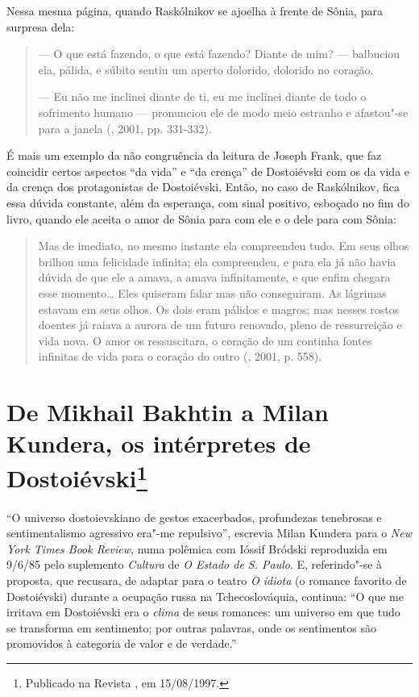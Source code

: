 Nessa mesma página, quando Raskólnikov se ajoelha à frente de Sônia,
para surpresa dela:

\begin{quotation}
--- O que está fazendo, o que está fazendo? Diante de mim? --- balbuciou
ela, pálida, e súbito sentiu um aperto dolorido, dolorido no coração.

--- Eu não me inclinei diante de ti, eu me inclinei diante de todo o
sofrimento humano --- pronunciou ele de modo meio estranho e afastou"-se
para a janela (, 2001, pp. 331-332).
\end{quotation}

É mais um exemplo da não congruência da leitura de Joseph Frank, que faz
coincidir certos aspectos ``da vida'' e ``da crença'' de Dostoiévski com
os da vida e da crença dos protagonistas de Dostoiévski. Então, no caso
de Raskólnikov, fica essa dúvida constante, além da esperança, com sinal
positivo, esboçado no fim do livro, quando ele aceita o amor de Sônia
para com ele e o dele para com Sônia:

\begin{quotation}
Mas de imediato, no mesmo instante ela compreendeu tudo. Em seus olhos
brilhou uma felicidade infinita; ela compreendeu, e para ela já não
havia dúvida de que ele a amava, a amava infinitamente, e que enfim
chegara esse momento\ldots{} Eles quiseram falar mas não conseguiram. As
lágrimas estavam em seus olhos. Os dois eram pálidos e magros; mas
nesses rostos doentes já raiava a aurora de um futuro renovado, pleno de
ressurreição e vida nova. O amor os ressuscitara, o coração de um
continha fontes infinitas de vida para o coração do outro (, 2001, p. 558).
\end{quotation}

\chapter{De Mikhail Bakhtin a Milan Kundera, os intérpretes de
Dostoiévski\footnote{Publicado na Revista {}, em 15/08/1997.}}

``O universo dostoievskiano de gestos exacerbados, profundezas
tenebrosas e sentimen­talismo agressivo era"-me repulsivo'', escrevia
Milan Kundera para o \emph{New York Times Book Review}, numa polêmica
com Ióssif Bródski reproduzida em 9/6/85 pelo suplemento \emph{Cultura}
de \emph{O Estado de S. Paulo}. E, referindo"-se à proposta, que
recusara, de adaptar para o teatro \emph{O idiota} (o romance favorito
de Dostoiévski) durante a ocupação russa na Tchecoslováquia, continua:
``O que me irritava em Dostoiévski era o \emph{clima} de seus romances:
um universo em que tudo se transforma em sentimento; por outras
palavras, onde os sentimentos são promovidos à categoria de valor e de
verdade.''

